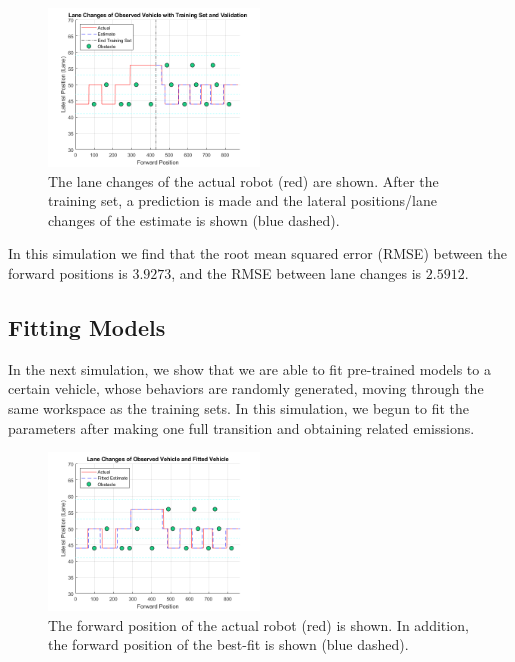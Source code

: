 \documentclass[letterpaper, 10 pt, conference]{ieeeconf}  %
\begin{document}
\begin{figure}[ht]
    \includegraphics[width=0.5\textwidth]{train2.png}
    \caption{The lane changes of the actual robot (red) are shown. After the training set, a prediction is made and the lateral positions/lane changes of the estimate is shown (blue dashed).}
    \label{fig:train2}
\end{figure}

In this simulation we find that the root mean squared error (RMSE) between the forward positions is $3.9273$, and the RMSE between lane changes is $2.5912$.  

\subsection{Fitting Models}

In the next simulation, we show that we are able to fit pre-trained models to a certain vehicle, whose behaviors are randomly generated, moving through the same workspace as the training sets. In this simulation, we begun to fit the parameters after making one full transition and obtaining related emissions. 

\begin{figure}[ht]
    \includegraphics[width=0.5\textwidth]{fit2.png}
    \caption{The forward position of the actual robot (red) is shown. In addition, the forward position of the best-fit is shown (blue dashed).}
    \label{fig:fwd}
\end{figure}
\end{document}
